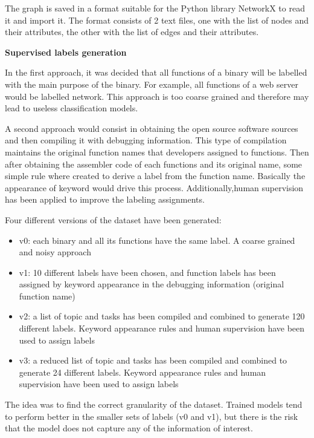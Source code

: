 The graph is saved in a format suitable for the Python library NetworkX to read it and import it. The format consists of 2 text files, one with the list of nodes and their attributes, the other with the list of edges and their attributes.




\textbf{Supervised labels generation}


In the first approach, it was decided that all functions of a binary will be labelled with the main purpose of the binary. For example, all functions of a web server would be labelled network. This approach is too coarse grained and therefore may lead to useless classification models.
 
A second approach would consist in obtaining the open source software sources and then compiling it with debugging information. This type of compilation maintains the original function names that developers assigned to functions. Then after obtaining the assembler code of each functions and its original name, some simple rule where created to derive a label from the function name. Basically the appearance of keyword would drive this process. Additionally,human supervision has been applied to improve the labeling assignments. 

Four different versions of the dataset have been generated:
\begin{itemize}
	\item v0: each binary and all its functions have the same label. A coarse grained and noisy approach
	\item v1: 10 different labels have been chosen, and function labels has been assigned by keyword appearance in the debugging information (original function name)
	\item v2: a list of topic and tasks has been compiled and combined to generate 120 different labels. Keyword appearance rules and human supervision have been used to assign labels
	\item v3: a reduced list of topic and tasks has been compiled and combined to generate 24 different labels. Keyword appearance rules and human supervision have been used to assign labels
\end{itemize}
The idea was to find the correct granularity of the dataset. Trained models tend to perform better in the smaller sets of labels (v0 and v1), but there is the risk that the model does not capture any of the information of interest. 





